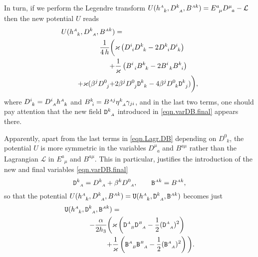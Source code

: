 \documentclass[
10pt, %
a4paper, %
oneside, %
twocolumn,
headinclude,footinclude, %
BCOR5mm, %
]{scrartcl}
\newcommand{\sA}{\mathsmaller A}
\newcommand{\sB}{\mathsmaller B}
\newcommand{\tetrsymbol}{h}
\newcommand{\itetrsymbol}{\eta}
\newcommand{\itetr}[2]{\itetrsymbol^{#1}_{\phantom{#1}#2}}
\newcommand{\tetr}[2]{\tetrsymbol^{#1}_{\phantom{#1}#2}}
\newcommand{\detTetr}{\tetrsymbol}
\newcommand{\ET}[2]{E^{#1}_{\phantom{#1}#2}}	%
\newcommand{\Dm}[2]{D_{\phantom{#2}#1}^{#2}}	%
\newcommand{\Dfin}[2]{\mathtt{D}_{\phantom{#2}#1}^{#2}}	%
\newcommand{\Ufin}{\mathtt{U}}
\newcommand{\BT}[2]{B^{#1#2}}	%
\newcommand{\Bmmix}[2]{B^{#1}_{#2}}	%
\newcommand{\Bm}[2]{B^{#1#2}}	%
\newcommand{\Bfin}[2]{\mathtt{B}^{#1#2}}	%
\newcommand{\Bfinmix}[2]{\mathtt{B}^{#1}_{\phantom{#1}#2}}	%
\newcommand{\LagBE}{\mathcal{L}}%
\newcommand{\Um}{U}%
\begin{document}
	In turn, if we perform the Legendre transform $ \Um(\tetr{\sA}{k},\Dm{\sA}{k},\Bm{\sA}{k}) = 
	\ET{a}{\mu} 
	\Dm{a}{\mu} - \LagBE$
	then the new potential $ \Um $ reads
	\begin{align}\label{eqn.Lagr.DB}
		\Um(\tetr{\sA}{k},\Dm{\sA}{k},\Bm{\sA}{k}) &= \nonumber\\ 
	  	\frac{1}{4\,h} \bigg( &\varkappa \left(
		\Dm{i}{i}\Dm{k}{k} - 2 \Dm{i}{k}\Dm{k}{i}
		\right)\nonumber\\
		 + &\frac{1}{\varkappa} \left ( 
		\Bmmix{i}{\ \,i}\Bmmix{k}{\ \,k}
		- 2 \Bmmix{i}{\ \,k}\Bmmix{k}{\ \,i}
		\right ) \nonumber\\
		+ \varkappa (\beta^j \Dm{j}{0} + &2 \beta^j \Dm{j}{0}\Dfin{k}{k} - 4 \beta^j \Dm{k}{0} 
		\Dfin{j}{k}) 
		\bigg),
	\end{align}
	where $ \Dm{k}{i} = \Dm{\sA}{i} \tetr{\sA}{k} $ and $ \Bmmix{k}{\ i} = \Bm{\sA}{j} 
	\itetr{k}{\sA} 
	\gamma_{ji} $, and in the last two terms, one should pay attention that the new field $ 
	\Dfin{\sA}{k} $ introduced in \eqref{eqn.varDB.final} appears there.
	
	Apparently, apart from the last terms in \eqref{eqn.Lagr.DB} depending on $ \Dm{k}{0} $, the 
	potential 
	$ \Um $ is more symmetric in the variables $ \Dm{a}{\mu} $ and $ 
	\Bm{a}{\mu} $ rather than the Lagrangian $ \LagBE $ in $ \ET{a}{\mu} $ and $ \BT{a}{\mu} $. 
	This in 
	particular, justifies the introduction of the new and final variables \eqref{eqn.varDB.final}
	\begin{equation}\label{eqn.db}
		\Dfin{\sA}{k} = \Dm{\sA}{k} + \beta^k \Dm{\sA}{0}, \qquad \Bfin{\sA}{k} = \Bm{\sA}{k},
	\end{equation}
	so that the potential $ \Um(\tetr{\sA}{k},\Dm{\sA}{k},\Bm{\sA}{k}) = 
	\Ufin(\tetr{\sA}{k},\Dfin{\sA}{k},\Bfin{\sA}{k})$ becomes just
	\begin{align}\label{eqn.Ufin}
		\Ufin(\tetr{\sA}{k},\Dfin{\sA}{k},\Bfin{\sA}{k}) &= \nonumber\\
		-\frac{\alpha}{2\detTetr_3} \bigg( 
		&\varkappa \left( \Dfin{\sB}{\sA} \Dfin{\sA}{\sB} 
		- \frac{1}{2} (\Dfin{\sA}{\sA})^2\right)\nonumber\\
		+
		&\frac{1}{\varkappa} \left( \Bfinmix{\sA}{\sB} \Bfinmix{\sB}{\sA} - \frac{1}{2} 
		(\Bfinmix{\sA}{\sA})^2
		\right)
		\bigg).
	\end{align}
	
\end{document}
